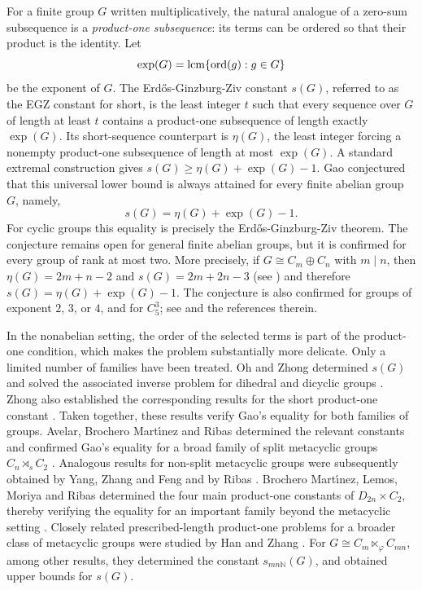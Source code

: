 \documentclass[a4paper, 12pt]{article}
\theoremstyle{definition}
\DeclareMathOperator{\ord}{ord}
\begin{document}
For a finite group $G$ written multiplicatively, the natural analogue
of a zero-sum subsequence is a \emph{product-one subsequence}: its
terms can be ordered so that their product is the identity. Let
$$\exp(G)=\mathop{\rm lcm}\{\ord(g):g\in G\}$$
be the exponent of $G$. The Erd\H{o}s-Ginzburg-Ziv constant $s(G)$, referred to as the EGZ constant for short,
is the least integer $t$ such that every sequence over $G$ of length
at least $t$ contains a product-one subsequence of length exactly
$\exp(G)$. Its short-sequence counterpart is $\eta(G)$, the least
integer forcing a nonempty product-one subsequence of length at most
$\exp(G)$. A standard extremal construction gives
$s(G)\geq\eta(G)+\exp(G)-1.$
Gao \cite[Conjecture 2.3]{GaoRestrictedII} conjectured that this universal lower bound
is always attained for every finite abelian group $G$, namely,
$$
s(G)=\eta(G)+\exp(G)-1.
$$
For cyclic groups this equality is precisely the Erd\H{o}s-Ginzburg-Ziv
theorem. The conjecture remains open for general finite abelian
groups, but it is confirmed for every group of rank at most two. More
precisely, if $G\cong C_m\oplus C_n$ with $m\mid n$, then
$\eta(G)=2m+n-2$ and
$s(G)=2m+2n-3$ (see \cite[Theorem~6.3]{GaoGeroldingersurvey})
and therefore $s(G)=\eta(G)+\exp(G)-1$. The conjecture is also confirmed
for groups of exponent $2$, $3$, or $4$, and for $C_5^3$; see
\cite[Theorem 6.6]{GaoGeroldingersurvey} and the references therein.

In the nonabelian setting, the order of the selected terms is part of
the product-one condition, which makes the problem substantially more
delicate. Only a limited number of families have been treated.
Oh and Zhong determined $s(G)$ and solved the associated inverse problem for dihedral and dicyclic groups \cite{OhZhong2020}. Zhong also established the corresponding results for the short product-one constant \cite{Zhong2021}. Taken together, these results verify Gao's equality for both families of groups.
Avelar, Brochero
Mart\'{\i}nez and Ribas determined the relevant constants and confirmed
Gao's equality for a broad family of split metacyclic groups
$C_n\rtimes_s C_2$ \cite{AvelarBrocheroRibas2023}. Analogous results
for non-split metacyclic groups were subsequently obtained by Yang,
Zhang and Feng \cite{YangZhangFeng2024} and by Ribas
\cite{Ribas2025}.  Brochero Mart\'{\i}nez, Lemos, Moriya and Ribas
determined the four main product-one constants of
$D_{2n}\times C_2$, thereby verifying the equality for an important
family beyond the metacyclic setting \cite{BLMR}. Closely related prescribed-length product-one problems for a broader
class of metacyclic groups were studied by Han and Zhang \cite{HanZhang2019}. For
$G\cong C_m\ltimes_{\varphi}C_{mn}$, among other results, they determined the constant
$s_{mn\mathbb N}(G)$, and obtained upper bounds for
$s(G)$.
\end{document}
